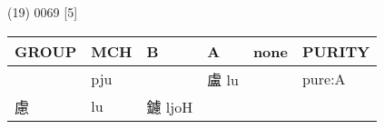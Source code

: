 \documentclass[14pt,a4paper]{scrartcl}
\begin{document}
(19) 0069 {[}5{]}

\begin{longtable}[c]{@{}llllll@{}}
\toprule
\begin{minipage}[b]{0.14\columnwidth}\raggedright\strut
GROUP
\strut\end{minipage} &
\begin{minipage}[b]{0.14\columnwidth}\raggedright\strut
MCH
\strut\end{minipage} &
\begin{minipage}[b]{0.14\columnwidth}\raggedright\strut
B
\strut\end{minipage} &
\begin{minipage}[b]{0.14\columnwidth}\raggedright\strut
A
\strut\end{minipage} &
\begin{minipage}[b]{0.14\columnwidth}\raggedright\strut
none
\strut\end{minipage} &
\begin{minipage}[b]{0.14\columnwidth}\raggedright\strut
PURITY
\strut\end{minipage}\tabularnewline
\midrule
\endhead
\begin{minipage}[t]{0.14\columnwidth}\raggedright\strut
𧆣
\strut\end{minipage} &
\begin{minipage}[t]{0.14\columnwidth}\raggedright\strut
pju
\strut\end{minipage} &
\begin{minipage}[t]{0.14\columnwidth}\raggedright\strut
\strut\end{minipage} &
\begin{minipage}[t]{0.14\columnwidth}\raggedright\strut
盧 lu
\strut\end{minipage} &
\begin{minipage}[t]{0.14\columnwidth}\raggedright\strut
\strut\end{minipage} &
\begin{minipage}[t]{0.14\columnwidth}\raggedright\strut
pure:A
\strut\end{minipage}\tabularnewline
\begin{minipage}[t]{0.14\columnwidth}\raggedright\strut
慮
\strut\end{minipage} &
\begin{minipage}[t]{0.14\columnwidth}\raggedright\strut
lu
\strut\end{minipage} &
\begin{minipage}[t]{0.14\columnwidth}\raggedright\strut
鑢 ljoH
\strut\end{minipage} &

\end{longtable}
\end{document}
